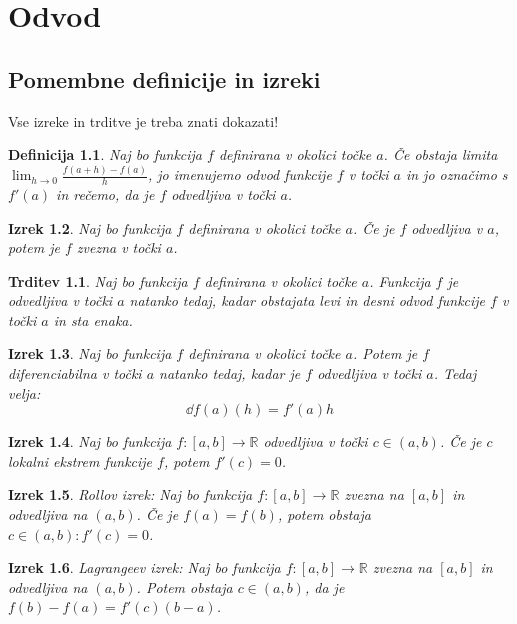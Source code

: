 \documentclass[a4paper,12pt]{report}
\newtheorem{izrek}{Izrek}[section]
\newtheorem{definicija}[izrek]{Definicija}
\newtheorem{trditev}{Trditev}
\begin{document}
\chapter{Odvod}

\section*{Pomembne definicije in izreki}

Vse izreke in trditve je treba znati dokazati!

\begin{definicija}
    Naj bo funkcija $f$ definirana v okolici točke $a$. Če obstaja limita
     $\lim_{h\to 0}\frac{f(a+h)-f(a)}{h}$, jo imenujemo odvod funkcije $f$ v 
     točki $a$ in jo označimo s $f'(a)$ in rečemo, da je $f$ odvedljiva v točki $a$.
\end{definicija}

\begin{izrek}
    Naj bo funkcija $f$ definirana v okolici točke $a$. Če je $f$ odvedljiva v $a$, 
    potem je $f$ zvezna v točki $a$.
\end{izrek}

\begin{trditev}
    Naj bo funkcija $f$ definirana v okolici točke $a$. Funkcija $f$ je odvedljiva v točki $a$
     natanko tedaj, kadar obstajata levi in desni odvod funkcije $f$ v točki $a$ in sta enaka.
\end{trditev}

\begin{izrek}
    Naj bo funkcija $f$ definirana v okolici točke $a$. Potem je $f$ diferenciabilna v točki $a$ 
    natanko tedaj, kadar je $f$ odvedljiva v točki $a$. Tedaj velja: $$\dd f(a)(h)=f'(a) h$$ 
\end{izrek}

\begin{izrek}
    Naj bo funkcija $f: [a,b] \to \mathbb{R}$ odvedljiva v točki $c \in (a,b)$. 
    Če je $c$ lokalni ekstrem funkcije $f$, potem $f'(c)=0$. 
\end{izrek}

\begin{izrek}
    \emph{Rollov izrek}: Naj bo funkcija $f: [a,b] \to \mathbb{R}$ zvezna na $[a,b]$ in odvedljiva na $(a,b)$. 
    Če je $f(a)=f(b)$, potem obstaja $c \in (a,b): f'(c)=0$.
\end{izrek}

\begin{izrek}
    \emph{Lagrangeev izrek}: Naj bo funkcija $f: [a,b] \to \mathbb{R}$ zvezna na $[a,b]$ in odvedljiva na $(a,b)$. 
    Potem obstaja $c \in (a,b)$, da je $f(b)-f(a)=f'(c)(b-a)$.
\end{izrek}
\end{document}
